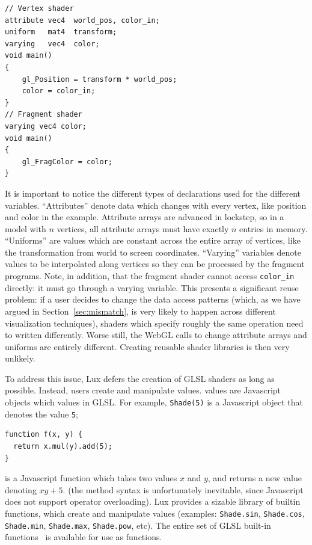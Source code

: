 \begin{verbatim}
// Vertex shader
attribute vec4  world_pos, color_in;
uniform   mat4  transform;
varying   vec4  color;
void main()
{
    gl_Position = transform * world_pos;
    color = color_in;
}
// Fragment shader
varying vec4 color;
void main()
{
    gl_FragColor = color;
}
\end{verbatim}

It is important to notice the different types of declarations used for
the different variables. ``Attributes'' denote data which changes
with every vertex, like position and color in the example. Attribute
arrays are advanced in lockstep, so in a model with $n$ vertices, all
attribute arrays must have exactly $n$ entries in memory. ``Uniforms'' are
values which are constant across the entire array of vertices, like the
transformation from world to screen coordinates. ``Varying'' variables
denote values to be interpolated along vertices so they can be
processed by the fragment programs. Note, in addition, that the
fragment shader cannot access \texttt{color\_in} directly: it must go
through a varying variable. This presents a significant reuse problem:
if a user decides to change the data access patterns (which, as we
have argued in Section~\ref{sec:mismatch}, is very likely to happen
across different visualization techniques), shaders which specify
roughly the same operation need to written differently. Worse still,
the WebGL calls to change attribute arrays and uniforms are entirely
different. Creating reusable shader libraries is then very unlikely.

To address this issue, Lux defers the creation of GLSL shaders as
long as possible. Instead, users create and manipulate \Shade
values. \Shade values are Javascript objects which
values in GLSL. For example, \texttt{Shade(5)} is a Javascript object that
denotes the value \texttt{5};
\begin{verbatim}
function f(x, y) {
  return x.mul(y).add(5);
}
\end{verbatim}
\noindent is a Javascript function which takes two \Shade values $x$
and $y$, and returns a new \Shade value denoting $xy + 5$. (the method
syntax is unfortunately inevitable, since Javascript does not support
operator overloading). Lux provides a sizable library of
builtin \Shade functions, which create and manipulate \Shade values
(examples: \texttt{Shade.sin}, \texttt{Shade.cos}, \texttt{Shade.min},
\texttt{Shade.max}, \texttt{Shade.pow}, etc). The entire set of GLSL
built-in functions~\cite{opengles-spec} is available for use as \Shade
functions.

